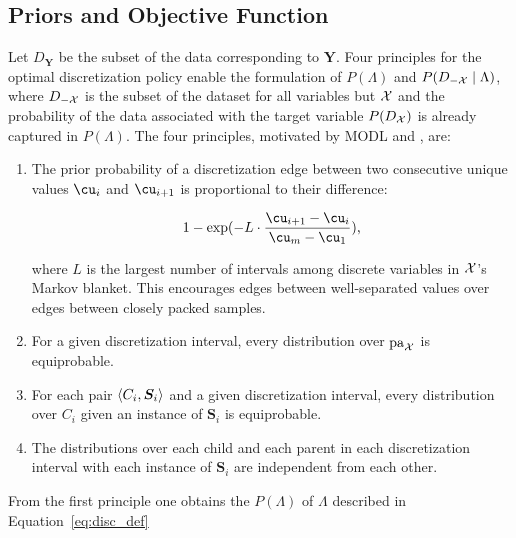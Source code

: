 

\subsection{Priors and Objective Function}

Let $D_{\bm{Y}}$ be the subset of the data corresponding to $\bm{Y}$.
Four principles for the optimal discretization policy enable the formulation of $P(\Lambda)$ and $P(D_{-\mathcal{X}} \mid \Lambda)$, where $D_{-\mathcal{X}}$ is the subset of the dataset for all variables but $\mathcal{X}$ and the probability of the data associated with the target variable $P(D_{\mathcal{X}})$ is already captured in $P(\Lambda)$.
The four principles, motivated by MODL and \cite{Lustgarten_2011}, are:

\begin{enumerate}
\item The prior probability of a discretization edge between two consecutive unique values $\cu_i$ and $\cu_{i+1}$ is proportional to their difference:

  \begin{equation}
  1 - {\exp(- L \cdot {\frac{\cu_{i+1} - \cu_i}{\cu_m - \cu_1}})}\text{,}
  \end{equation}

where $L$ is the largest number of intervals among discrete variables in $\mathcal{X}$'s Markov blanket.
This encourages edges between well-separated values over edges between closely packed samples.

\item For a given discretization interval, every distribution over $\operatorname{pa}_{\mathcal{X}}$ is equiprobable.
\item For each pair $\langle C_i,\bm{S}_i \rangle$ and a given discretization interval, every distribution over $C_i$ given an instance of $\bm{S}_i$ is equiprobable.
\item The distributions over each child and each parent in each discretization interval with each instance of $\bm{S}_i$ are independent from each other.
\end{enumerate}

From the first principle one obtains the $P(\Lambda)$ of $\Lambda$ described in Equation~\ref{eq:disc_def}

